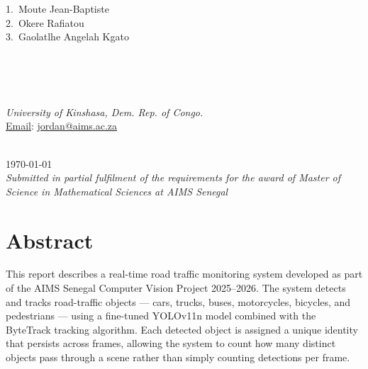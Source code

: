 \documentclass[12pt,a4paper,leqno]{report}
\begin{document}
\begin{titlepage}
\begin{center}
\begin{tcolorbox}[skin=beamer,beamer,shadow={5.5mm}{-3.5mm}{2mm}{fill=blue,opacity=0.25}]
    \end{tcolorbox}\\[1cm]
    \textbf{\selectfont{}}\\[0.6cm]
    \begin{minipage}{.8\linewidth}\begin{flushleft}
      1.\ Moute Jean-Baptiste\\[0.3em]
      2.\ Okere Rafiatou\\[0.3em]
      3.\ Gaolatlhe Angelah Kgato
    \end{flushleft}\end{minipage}\\[0.8cm]
    \textbf{}\\[0.25cm]
    \begin{tcolorbox}[rightrule=3mm]\begin{center}
      \\[0.3cm]
      {\it{}\selectfont\textcolor{blue!50!black}{University of Kinshasa, Dem. Rep. of Congo.}}\\[0.2cm]
      \underline{Email}: \url{jordan@aims.ac.za}
    \end{center}\end{tcolorbox}\\[0.6cm]
    {\small\today}\\[0.2cm]
    {\scriptsize\it Submitted in partial fulfilment of the requirements for the award of
    Master of Science in Mathematical Sciences at AIMS Senegal}
  \end{center}
\end{titlepage}

\setcounter{page}{1}

\chapter*{Abstract}

This report describes a real-time road traffic monitoring system developed as part of the AIMS Senegal Computer Vision Project 2025--2026. The system detects and tracks road-traffic objects — cars, trucks, buses, motorcycles, bicycles, and pedestrians — using a fine-tuned YOLOv11n model combined with the ByteTrack tracking algorithm. Each detected object is assigned a unique identity that persists across frames, allowing the system to count how many distinct objects pass through a scene rather than simply counting detections per frame.
\end{document}
